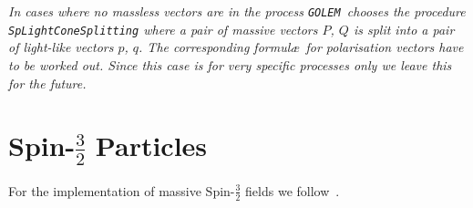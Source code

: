 \documentclass[a4paper,12pt]{amsart}
\newcommand{\golem}{{\texttt{GOLEM}}}
\begin{document}
\begin{flushleft}
\begin{list}{}{\setlength{\itemsep}{-\parsep}\setlength{\itemindent}{-\leftmargin}}
\item{}
\end{list}
\vspace{4ex}
\end{flushleft}
\TODO{}\textit{In cases where no massless vectors are in the process
\golem\ chooses the procedure \texttt{SpLightConeSplitting} where a pair
of massive vectors $P$, $Q$ is split into a pair of light-like vectors
$p$, $q$. The corresponding formul\ae\ for polarisation vectors have to
be worked out. Since this case is for very specific processes only we
leave this for the future.}


\section{Spin-\texorpdfstring{$\frac32$}{3/2} Particles}
For the implementation of massive Spin-$\frac32$ fields we
follow~\cite{Kilian:2007gr}.
\end{document}
